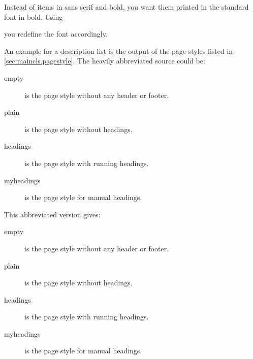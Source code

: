     \begin{Example}
      Instead of items in sans serif and bold, you want them printed in the
      standard font in bold. Using
\begin{lstcode}
\end{lstcode}
      you redefine the font accordingly.

      An example for a description list is the output of the page styles
      listed in \autoref{sec:maincls.pagestyle}. The heavily
      abbreviated source could be:
\begin{lstcode}
  \begin{description}
  \item[empty] is the page style without any header or footer.
    \item[plain] is the page style without headings.
    \item[headings] is the page style with running headings.
    \item[myheadings] is the page style for manual headings.
  \end{description}
\end{lstcode}
      This abbreviated version gives:
      \begin{ShowOutput}
        \begin{description}
        \item[empty] is the page style without any header or footer.
        \item[plain] is the page style without headings.
        \item[headings] is the page style with running headings.
        \item[myheadings] is the page style for manual headings.
        \end{description}
      \end{ShowOutput}
    \end{Example}
  \fi%
  \EndIndexGroup%
\fi

